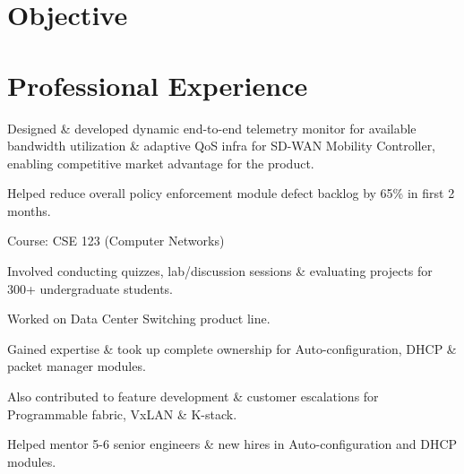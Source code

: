 \documentclass[]{deedy-resume-openfont}
\begin{document}
\hfill
\begin{minipage}[t]{0.66\textwidth} 


\section{Objective}


\section{Professional Experience}
\vspace{\topsep} %
\begin{tightemize}
\item Designed \& developed dynamic end-to-end telemetry monitor for available bandwidth utilization \& adaptive QoS infra for SD-WAN Mobility Controller, enabling competitive market advantage for the product. 
\item Helped reduce overall policy enforcement module defect backlog by 65\% in first 2 months. 
\end{tightemize}
\sectionsep

\begin{tightemize} 
\item Course: CSE 123 (Computer Networks) 
\item Involved conducting quizzes, lab/discussion sessions \& evaluating projects for 300+ undergraduate students. 
\end{tightemize}
\sectionsep

\begin{tightemize}
\item Worked on Data Center Switching product line.
\item Gained expertise \& took up complete ownership for Auto-configuration, DHCP \& packet manager modules.
\item Also contributed to feature development \& customer escalations for Programmable fabric, VxLAN \& K-stack.
\item Helped mentor 5-6 senior engineers \& new hires in Auto-configuration and DHCP modules. 
\end{tightemize}
\sectionsep


\end{minipage}
\end{document}
